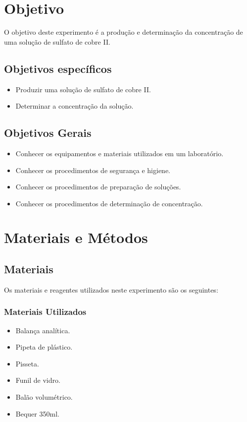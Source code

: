 \documentclass[a4paper, 11pt]{article}
\begin{document}
    \section{Objetivo}\label{sec:objetivo}

    \indent O objetivo deste experimento é a produção e determinação da concentração de uma solução de sulfato de cobre II\@.

    \subsection*{Objetivos específicos}\label{sec:objetivos_especificos}

    \begin{itemize}
        \item Produzir uma solução de sulfato de cobre II\@.
        \item Determinar a concentração da solução\@.
    \end{itemize}

    \subsection*{Objetivos Gerais}\label{sec:objetivos_gerais}

    \begin{itemize}
        \item Conhecer os equipamentos e materiais utilizados em um laboratório\@.
        \item Conhecer os procedimentos de segurança e higiene\@.
        \item Conhecer os procedimentos de preparação de soluções\@.
        \item Conhecer os procedimentos de determinação de concentração\@.
    \end{itemize}
    \newpage
    \section{Materiais e Métodos}\label{sec:materiais_metodos}
    \subsection{Materiais}\label{sec:materiais}
    \indent Os materiais e reagentes utilizados neste experimento são os seguintes\@:
    \subsubsection{Materiais Utilizados}\label{sec:materiais_utilizados}
    \begin{itemize}
        \item Balança analítica\@.
        \item Pipeta de plástico\@.
        \item Pisseta\@.
        \item Funil de vidro\@.
        \item Balão volumétrico\@.
        \item Bequer 350ml\@.
    \end{itemize}
    \doublespacing
\end{document}
